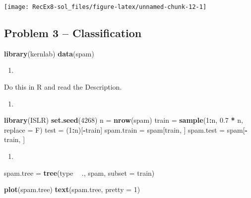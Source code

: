 \documentclass[]{article}
\newenvironment{Shaded}{\begin{snugshade}}{\end{snugshade}}
\newcommand{\DataTypeTok}[1]{\textcolor[rgb]{0.13,0.29,0.53}{#1}}
\newcommand{\DecValTok}[1]{\textcolor[rgb]{0.00,0.00,0.81}{#1}}
\newcommand{\FloatTok}[1]{\textcolor[rgb]{0.00,0.00,0.81}{#1}}
\newcommand{\KeywordTok}[1]{\textcolor[rgb]{0.13,0.29,0.53}{\textbf{#1}}}
\newcommand{\NormalTok}[1]{#1}
\newcommand{\OperatorTok}[1]{\textcolor[rgb]{0.81,0.36,0.00}{\textbf{#1}}}
\newcommand{\StringTok}[1]{\textcolor[rgb]{0.31,0.60,0.02}{#1}}
\begin{document}
\texttt{[image: RecEx8-sol\_files/figure-latex/unnamed-chunk-12-1]}

\hypertarget{problem-3-classification}{%
\subsection{Problem 3 --
Classification}\label{problem-3-classification}}

\begin{Shaded}
\begin{Highlighting}[]
\KeywordTok{library}\NormalTok{(kernlab)}
\KeywordTok{data}\NormalTok{(spam)}
\end{Highlighting}
\end{Shaded}

\begin{enumerate}
\def\labelenumi{\alph{enumi})}
\item
\end{enumerate}

Do this in R and read the Description.

\begin{enumerate}
\def\labelenumi{\alph{enumi})}
\setcounter{enumi}{1}
\item
\end{enumerate}

\begin{Shaded}
\begin{Highlighting}[]
\KeywordTok{library}\NormalTok{(ISLR)}
\KeywordTok{set.seed}\NormalTok{(}\DecValTok{4268}\NormalTok{)}
\NormalTok{n =}\StringTok{ }\KeywordTok{nrow}\NormalTok{(spam)}
\NormalTok{train =}\StringTok{ }\KeywordTok{sample}\NormalTok{(}\DecValTok{1}\OperatorTok{:}\NormalTok{n, }\FloatTok{0.7} \OperatorTok{*}\StringTok{ }\NormalTok{n, }\DataTypeTok{replace =}\NormalTok{ F)}
\NormalTok{test =}\StringTok{ }\NormalTok{(}\DecValTok{1}\OperatorTok{:}\NormalTok{n)[}\OperatorTok{-}\NormalTok{train]}
\NormalTok{spam.train =}\StringTok{ }\NormalTok{spam[train, ]}
\NormalTok{spam.test =}\StringTok{ }\NormalTok{spam[}\OperatorTok{-}\NormalTok{train, ]}
\end{Highlighting}
\end{Shaded}

\begin{enumerate}
\def\labelenumi{\alph{enumi})}
\setcounter{enumi}{2}
\item
\end{enumerate}

\begin{Shaded}
\begin{Highlighting}[]
\NormalTok{spam.tree =}\StringTok{ }\KeywordTok{tree}\NormalTok{(type }\OperatorTok{~}\StringTok{ }\NormalTok{., spam, }\DataTypeTok{subset =}\NormalTok{ train)}

\KeywordTok{plot}\NormalTok{(spam.tree)}
\KeywordTok{text}\NormalTok{(spam.tree, }\DataTypeTok{pretty =} \DecValTok{1}\NormalTok{)}
\end{Highlighting}
\end{Shaded}
\end{document}

